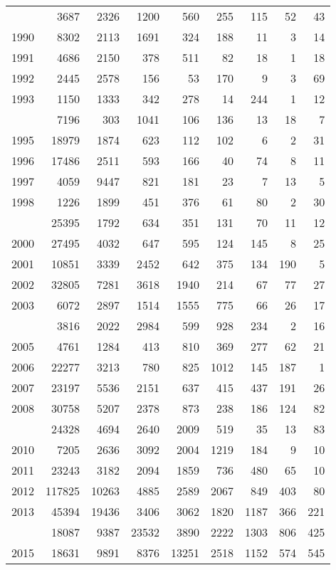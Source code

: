 \documentclass[
]{article}
\begin{document}
\begin{longtable}[t]{lrrrrrrrr}
\endfoot
\bottomrule
\endlastfoot
1989 & 3687 & 2326 & 1200 & 560 & 255 & 115 & 52 & 43\\
1990 & 8302 & 2113 & 1691 & 324 & 188 & 11 & 3 & 14\\
1991 & 4686 & 2150 & 378 & 511 & 82 & 18 & 1 & 18\\
1992 & 2445 & 2578 & 156 & 53 & 170 & 9 & 3 & 69\\
1993 & 1150 & 1333 & 342 & 278 & 14 & 244 & 1 & 12\\
\addlinespace
1994 & 7196 & 303 & 1041 & 106 & 136 & 13 & 18 & 7\\
1995 & 18979 & 1874 & 623 & 112 & 102 & 6 & 2 & 31\\
1996 & 17486 & 2511 & 593 & 166 & 40 & 74 & 8 & 11\\
1997 & 4059 & 9447 & 821 & 181 & 23 & 7 & 13 & 5\\
1998 & 1226 & 1899 & 451 & 376 & 61 & 80 & 2 & 30\\
\addlinespace
1999 & 25395 & 1792 & 634 & 351 & 131 & 70 & 11 & 12\\
2000 & 27495 & 4032 & 647 & 595 & 124 & 145 & 8 & 25\\
2001 & 10851 & 3339 & 2452 & 642 & 375 & 134 & 190 & 5\\
2002 & 32805 & 7281 & 3618 & 1940 & 214 & 67 & 77 & 27\\
2003 & 6072 & 2897 & 1514 & 1555 & 775 & 66 & 26 & 17\\
\addlinespace
2004 & 3816 & 2022 & 2984 & 599 & 928 & 234 & 2 & 16\\
2005 & 4761 & 1284 & 413 & 810 & 369 & 277 & 62 & 21\\
2006 & 22277 & 3213 & 780 & 825 & 1012 & 145 & 187 & 1\\
2007 & 23197 & 5536 & 2151 & 637 & 415 & 437 & 191 & 26\\
2008 & 30758 & 5207 & 2378 & 873 & 238 & 186 & 124 & 82\\
\addlinespace
2009 & 24328 & 4694 & 2640 & 2009 & 519 & 35 & 13 & 83\\
2010 & 7205 & 2636 & 3092 & 2004 & 1219 & 184 & 9 & 10\\
2011 & 23243 & 3182 & 2094 & 1859 & 736 & 480 & 65 & 10\\
2012 & 117825 & 10263 & 4885 & 2589 & 2067 & 849 & 403 & 80\\
2013 & 45394 & 19436 & 3406 & 3062 & 1820 & 1187 & 366 & 221\\
\addlinespace
2014 & 18087 & 9387 & 23532 & 3890 & 2222 & 1303 & 806 & 425\\
2015 & 18631 & 9891 & 8376 & 13251 & 2518 & 1152 & 574 & 545\\

\end{longtable}
\end{document}
